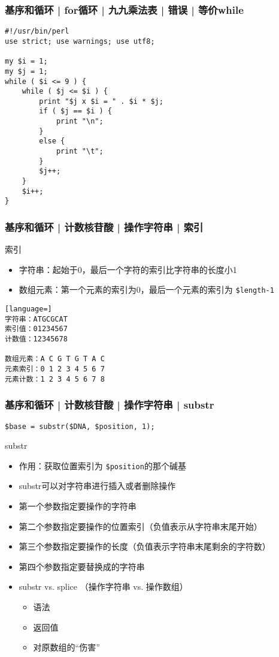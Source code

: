 \begin{frame}[fragile]
  \frametitle{基序和循环 | for循环 | 九九乘法表 | 错误 | 等价while}
\begin{lstlisting}[basicstyle=\small\tt,numberstyle=\footnotesize]
#!/usr/bin/perl 
use strict; use warnings; use utf8;

my $i = 1;
my $j = 1;
while ( $i <= 9 ) {
    while ( $j <= $i ) {
        print "$j x $i = " . $i * $j;
        if ( $j == $i ) {
            print "\n";
        }
        else {
            print "\t";
        }
        $j++;
    }
    $i++;
}
\end{lstlisting}
\end{frame}


\begin{frame}[fragile]
  \frametitle{基序和循环 | 计数核苷酸 | 操作字符串 | \alert{索引}}
  \begin{block}{索引}
  \begin{itemize}
    \item 字符串：起始于0，最后一个字符的索引比字符串的长度小1
    \item 数组元素：第一个元素的索引为0，最后一个元素的索引为 \verb|$length-1|
  \end{itemize}
  \end{block}
  \pause
\begin{lstlisting}[language=]
字符串：ATGCGCAT
索引值：01234567
计数值：12345678

数组元素：A C G T G T A C
元素索引：0 1 2 3 4 5 6 7
元素计数：1 2 3 4 5 6 7 8
\end{lstlisting}
\end{frame}

\begin{frame}[fragile]
  \frametitle{基序和循环 | 计数核苷酸 | 操作字符串 | \alert{substr}}
\begin{lstlisting}
$base = substr($DNA, $position, 1);
\end{lstlisting}
\pause
\begin{block}{substr}
  \begin{itemize}
    \item 作用：获取位置索引为 \verb|$position|的那个碱基
    \item substr可以对字符串进行插入或者删除操作
    \item 第一个参数指定要操作的字符串
    \item 第二个参数指定要操作的位置索引（负值表示从字符串末尾开始）
    \item 第三个参数指定要操作的长度（负值表示字符串末尾剩余的字符数）
    \item 第四个参数指定要替换成的字符串
    \item substr vs. splice （操作字符串 vs. 操作数组）
      \begin{itemize}
        \item 语法
        \item 返回值
        \item 对原数组的“伤害”
      \end{itemize}
  \end{itemize}
\end{block}
\end{frame}

